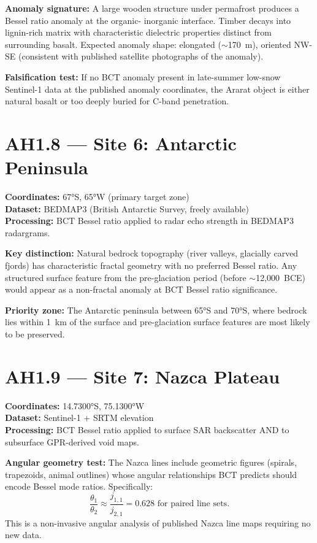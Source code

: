 \documentclass[12pt,twocolumn]{article}
\begin{document}
\textbf{Anomaly signature:} A large wooden structure under
permafrost produces a Bessel ratio anomaly at the organic-
inorganic interface. Timber decays into lignin-rich matrix
with characteristic dielectric properties distinct from
surrounding basalt. Expected anomaly shape: elongated
($\sim$170~m), oriented NW-SE (consistent with published
satellite photographs of the anomaly).

\textbf{Falsification test:} If no BCT anomaly present
in late-summer low-snow Sentinel-1 data at the published
anomaly coordinates, the Ararat object is either natural
basalt or too deeply buried for C-band penetration.

\section{AH1.8 --- Site 6: Antarctic Peninsula}

\textbf{Coordinates:} 67°S, 65°W (primary target zone)\\
\textbf{Dataset:} BEDMAP3 (British Antarctic Survey,
freely available)\\
\textbf{Processing:} BCT Bessel ratio applied to radar
echo strength in BEDMAP3 radargrams.

\textbf{Key distinction:} Natural bedrock topography
(river valleys, glacially carved fjords) has characteristic
fractal geometry with no preferred Bessel ratio. Any
structured surface feature from the pre-glaciation
period (before $\sim$12,000~BCE) would appear as a
non-fractal anomaly at BCT Bessel ratio significance.

\textbf{Priority zone:} The Antarctic peninsula between
65°S and 70°S, where bedrock lies within 1~km of the
surface and pre-glaciation surface features are most
likely to be preserved.

\section{AH1.9 --- Site 7: Nazca Plateau}

\textbf{Coordinates:} 14.7300°S, 75.1300°W\\
\textbf{Dataset:} Sentinel-1 + SRTM elevation\\
\textbf{Processing:} BCT Bessel ratio applied to surface
SAR backscatter AND to subsurface GPR-derived void maps.

\textbf{Angular geometry test:} The Nazca lines include
geometric figures (spirals, trapezoids, animal outlines)
whose angular relationships BCT predicts should encode
Bessel mode ratios. Specifically:
\begin{equation}
\frac{\theta_1}{\theta_2} \approx \frac{j_{1,1}}{j_{2,1}}
= 0.628 \text{ for paired line sets}.
\end{equation}
This is a non-invasive angular analysis of published
Nazca line maps requiring no new data.
\end{document}
